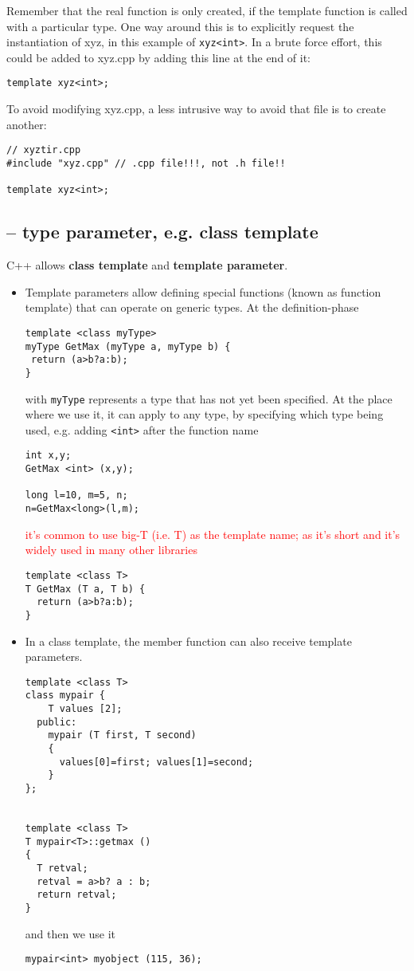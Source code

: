 Remember that the real function is only created, if the template function is
called with a particular type. 
One way around this is to explicitly request the instantiation of xyz, in this
example of \verb!xyz<int>!. In a brute force effort, this could be added to
xyz.cpp by adding this line at the end of it:
\begin{verbatim}
template xyz<int>;
\end{verbatim}
To avoid modifying xyz.cpp, a less intrusive way to avoid that file is to
create another:
\begin{verbatim}
// xyztir.cpp
#include "xyz.cpp" // .cpp file!!!, not .h file!!

template xyz<int>;
\end{verbatim}



\subsection{-- type parameter, e.g. class template}

C++ allows {\bf class template} and {\bf template parameter}. 
\begin{itemize}
  \item Template parameters allow defining special functions (known as
  function template) that can operate on generic types. At the definition-phase
  \begin{lstlisting}
template <class myType>
myType GetMax (myType a, myType b) {
 return (a>b?a:b);
}
  \end{lstlisting}
with \verb!myType! represents a type that has not yet been specified. At the
place where we use it, it can apply to any type, by specifying which type being
used, e.g. adding \verb!<int>! after the function name
\begin{lstlisting}
int x,y;
GetMax <int> (x,y);

long l=10, m=5, n;
n=GetMax<long>(l,m);
\end{lstlisting}
\textcolor{red}{it's common to use big-T (i.e. T) as the template name; as it's
short and it's widely used in many other libraries}
\begin{lstlisting}
template <class T>
T GetMax (T a, T b) {
  return (a>b?a:b);
}
\end{lstlisting}


\item In a class template, the member function can also receive template
parameters.
\begin{lstlisting}
template <class T>
class mypair {
    T values [2];
  public:
    mypair (T first, T second)
    {
      values[0]=first; values[1]=second;
    }
};


template <class T>
T mypair<T>::getmax ()
{
  T retval;
  retval = a>b? a : b;
  return retval;
}
\end{lstlisting}
and then we use it
\begin{verbatim}
mypair<int> myobject (115, 36); 
\end{verbatim}
\end{itemize}

